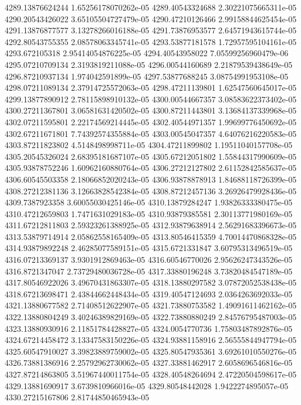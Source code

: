 {4289.13876624244 1.65256178070262e-05
4289.40543324688 2.30221075665311e-05
4290.20543426022 3.65105504727479e-05
4290.47210126466 2.99158844625454e-05
4291.13876877577 3.13278266016188e-05
4291.73876953577 2.64571943615744e-05
4292.80543755355 2.08578063345741e-05
4293.53877181578 1.72957595104161e-05
4293.672105318 2.95414054876225e-05
4294.40543958022 7.05599256960479e-06
4295.07210709134 2.3193819211088e-05
4296.00544160689 2.21879539438649e-05
4296.87210937134 1.974042591899e-05
4297.53877688245 3.08754991953108e-05
4298.07211089134 2.37914725572063e-05
4298.47211139801 1.62547560645017e-05
4299.13877890912 2.78115898910132e-05
4300.00544667357 3.08583622373402e-05
4300.27211367801 3.06581631420502e-05
4300.87211443801 3.13684137339968e-05
4302.07211595801 2.22174569214445e-05
4302.40544971357 1.99699776450692e-05
4302.67211671801 7.74392574355884e-05
4303.00545047357 4.64076216220583e-05
4303.87211823802 4.5148498998711e-05
4304.47211899802 1.19511040157708e-05
4305.20545326024 2.68395181687107e-05
4305.67212051802 1.55844317990609e-05
4305.93878752246 1.60962160880764e-05
4306.27212127802 2.61152842585637e-05
4306.60545503358 2.18066852020243e-05
4306.93878878913 1.84688118726399e-05
4308.27212381136 3.12663828542384e-05
4308.87212457136 3.26926479928436e-05
4309.7387923358 3.60055030425146e-05
4310.13879284247 1.93826333380475e-05
4310.47212659803 1.7471631029183e-05
4310.93879385581 2.30113771980169e-05
4311.67212811803 2.59323261388925e-05
4312.93879638914 2.56291683396673e-05
4313.53879714914 2.05862558165409e-05
4313.80546415359 4.70014470868328e-05
4314.93879892248 2.46285077589151e-05
4315.6721331847 3.60795313496519e-05
4316.07213369137 3.9301912869463e-05
4316.60546770026 2.95626247343526e-05
4316.8721347047 2.73729480036728e-05
4317.33880196248 3.73820484547189e-05
4317.80546922026 3.49670431863307e-05
4318.13880297582 3.07872052538438e-05
4318.67213698471 2.43844662448434e-05
4319.40547124693 2.0364263692033e-05
4321.13880677582 2.71408512622907e-05
4321.73880753582 1.49091611462162e-05
4322.13880804249 3.40246389829169e-05
4322.73880880249 2.84576795487003e-05
4323.13880930916 2.11851784428827e-05
4324.0054770736 1.75803487892876e-05
4324.67214458472 3.13347583150226e-05
4324.93881158916 2.56555844947794e-05
4325.60547910027 3.39823889759002e-05
4325.80547935361 3.69261010550276e-05
4326.73881386916 2.25792962730062e-05
4327.33881462917 2.6058696546816e-05
4327.87214863805 3.51967440011754e-05
4328.40548264694 2.47220504598617e-05
4329.13881690917 3.6739810966016e-05
4329.80548442028 1.9422274895057e-05
4330.27215167806 2.81744850465943e-05
}

